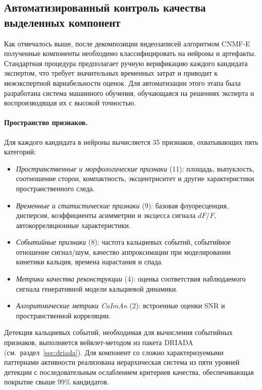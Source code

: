 
\subsection{Автоматизированный контроль качества выделенных компонент}\label{sec:autoinspect}

Как отмечалось выше, после декомпозиции видеозаписей алгоритмом CNMF-E полученные компоненты необходимо классифицировать на нейроны и артефакты. Стандартная процедура предполагает ручную верификацию каждого кандидата экспертом, что требует значительных временных затрат и приводит к межэкспертной вариабельности оценок. Для автоматизации этого этапа была разработана система машинного обучения, обучающаяся на решениях эксперта и воспроизводящая их с высокой точностью.

\paragraph{Пространство признаков.}
Для каждого кандидата в нейроны вычисляется 35 признаков, охватывающих пять категорий:
\begin{itemize}
    \itemsep0em
    \item \textit{Пространственные и морфологические признаки} (11): площадь, выпуклость, соотношение сторон, компактность, эксцентриситет и другие характеристики пространственного следа.
    \item \textit{Временные и статистические признаки} (9): базовая флуоресценция, дисперсия, коэффициенты асимметрии и эксцесса сигнала $dF/F$, автокорреляционные характеристики.
    \item \textit{Событийные признаки} (8): частота кальциевых событий, событийное отношение сигнал/шум, качество аппроксимации при моделировании кинетики кальция, времена нарастания и спада.
    \item \textit{Метрики качества реконструкции} (4): оценка соответствия наблюдаемого сигнала генеративной модели кальциевой динамики.
    \item \textit{Алгоритмические метрики CaImAn} (2): встроенные оценки SNR и пространственной корреляции.
\end{itemize}

Детекция кальциевых событий, необходимая для вычисления событийных признаков, выполняется вейвлет-методом из пакета DRIADA (см.\ раздел~\ref{sec:driada}). Для компонент со сложно характеризуемыми паттернами активности реализована иерархическая система из пяти уровней детекции с последовательным ослаблением критериев качества, обеспечивающая покрытие свыше 99\% кандидатов.

